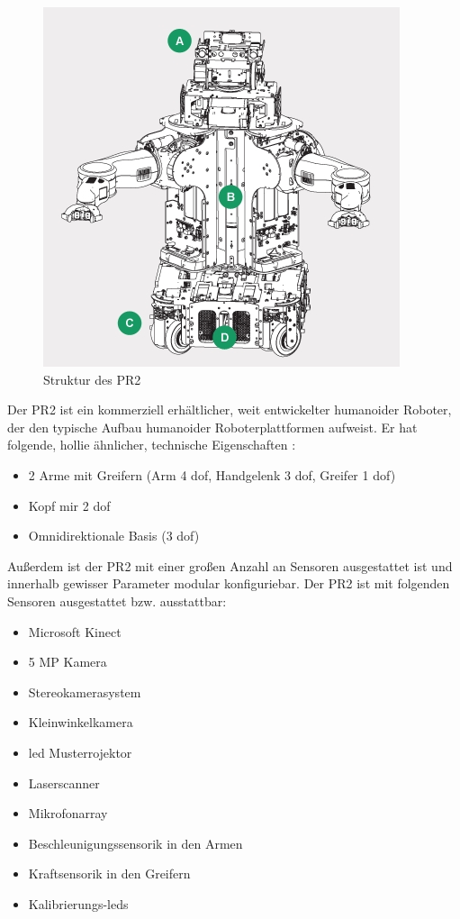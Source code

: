 \begin{figure}[h]
\center
\includegraphics[scale=0.5]{graphics/PR2Struktur.jpg}
\caption{\label{fig:PR2Struktur} Struktur des PR2 \citep{hspecsWG2012}}
\end{figure}

Der PR2 ist ein kommerziell erhältlicher, weit entwickelter humanoider Roboter, der den typische Aufbau humanoider Roboterplattformen aufweist.
 Er hat folgende, \gls{hollie} ähnlicher, technische Eigenschaften \citep{hspecsWG2012}:

\begin{itemize}
  \item 2 Arme mit Greifern (Arm 4 \gls{dof}, Handgelenk 3 \gls{dof}, Greifer 1 \gls{dof})
  \item Kopf mir 2 \gls{dof}
  \item Omnidirektionale Basis (3 \gls{dof})
\end{itemize}

Außerdem ist der PR2 mit einer großen Anzahl an Sensoren ausgestattet
 ist und innerhalb gewisser Parameter modular konfiguriebar.
 Der PR2 ist mit folgenden Sensoren ausgestattet bzw. ausstattbar:

\begin{itemize}
  \item Microsoft Kinect
  \item 5 MP Kamera
  \item Stereokamerasystem
  \item Kleinwinkelkamera
  \item \gls{led} Musterrojektor
  \item Laserscanner
  \item Mikrofonarray
  \item Beschleunigungssensorik in den Armen
  \item Kraftsensorik in den Greifern
  \item Kalibrierungs-\glspl{led}
\end{itemize}

